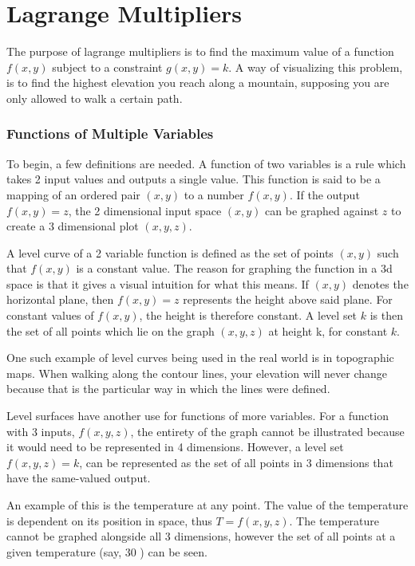 \documentclass{notes}
\begin{document}
\section*{Lagrange Multipliers}

The purpose of lagrange multipliers is to find the maximum value of a function \(f(x, y)\) subject to a constraint \(g(x, y) = k\). A way of visualizing this problem, is to find the highest elevation you reach along a mountain, supposing you are only allowed to walk a certain path.

\subsubsection*{Functions of Multiple Variables}

To begin, a few definitions are needed. A function of two variables is a rule which takes 2 input values and outputs a single value. This function is said to be a mapping of an ordered pair \((x, y)\) to a number \(f(x, y)\). If the output \(f(x, y) = z\), the 2 dimensional input space \((x, y)\) can be graphed against \(z\) to create a 3 dimensional plot \((x, y, z)\).

A level curve of a 2 variable function is defined as the set of points \((x, y)\) such that \(f(x, y)\) is a constant value. The reason for graphing the function in a 3d space is that it gives a visual intuition for what this means. If \((x, y)\) denotes the horizontal plane, then \(f(x, y) = z\) represents the height above said plane. For constant values of \(f(x, y)\), the height is therefore constant. A level set \(k\) is then the set of all points which lie on the graph \((x, y, z)\) at height k, for constant \(k\).

One such example of level curves being used in the real world is in topographic maps. When walking along the contour lines, your elevation will never change because that is the particular way in which the lines were defined.

Level surfaces have another use for functions of more variables. For a function with 3 inputs, \(f(x, y, z)\), the entirety of the graph cannot be illustrated because it would need to be represented in 4 dimensions. However, a level set \(f(x, y, z) = k\), can be represented as the set of all points in 3 dimensions that have the same-valued output.

An example of this is the temperature at any point. The value of the temperature is dependent on its position in space, thus \(T = f(x, y, z)\). The temperature cannot be graphed alongside all 3 dimensions, however the set of all points at a given temperature (say, 30 \celsius) can be seen.
\end{document}
